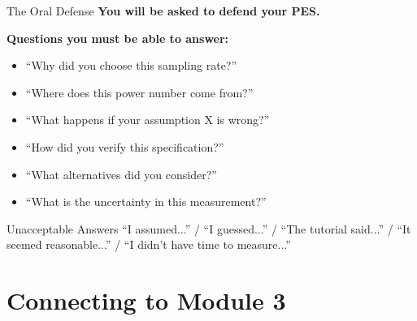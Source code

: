 \documentclass[aspectratio=169,11pt]{beamer}
\begin{document}
\begin{frame}{The Oral Defense}
    \textbf{You will be asked to defend your PES.}
    
    \vspace{0.3cm}
    \textbf{Questions you must be able to answer:}
    \begin{itemize}
        \item ``Why did you choose this sampling rate?''
        \item ``Where does this power number come from?''
        \item ``What happens if your assumption X is wrong?''
        \item ``How did you verify this specification?''
        \item ``What alternatives did you consider?''
        \item ``What is the uncertainty in this measurement?''
    \end{itemize}
    
    \vspace{0.3cm}
    \begin{alertblock}{Unacceptable Answers}
        ``I assumed...'' / ``I guessed...'' / ``The tutorial said...'' / ``It seemed reasonable...'' / ``I didn't have time to measure...''
    \end{alertblock}
\end{frame}

\section{Connecting to Module 3}
\end{document}
